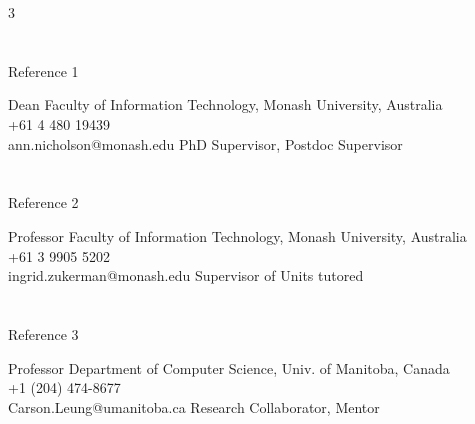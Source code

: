\begin{multicols}{3}

\section{\faUniversity}{Reference 1}
    
%
    {Dean}%
    {Faculty of Information Technology, Monash University, Australia\\ 
    \faPhone \hspace{5pt} +61 4 480 19439 \hspace{20pt}\\
    \faEnvelope \hspace{5pt} ann.nicholson@monash.edu}
    {PhD Supervisor, Postdoc Supervisor}



\columnbreak

\section{\faInstitution}{Reference 2}

%
    {Professor}%
    {Faculty of Information Technology, Monash University, Australia\\ 
    \faPhone \hspace{5pt} +61 3 9905 5202 \hspace{20pt}\\
    \faEnvelope \hspace{5pt} ingrid.zukerman@monash.edu}
    {Supervisor of Units tutored}


\columnbreak

\section{\faInstitution}{Reference 3}

%
    {Professor}%
    {Department of Computer Science, Univ. of Manitoba, Canada\\
    \faPhone \hspace{5pt}  +1 (204) 474-8677 \hspace{20pt}\\
    \faEnvelope \hspace{5pt} Carson.Leung@umanitoba.ca}
    {Research Collaborator, Mentor}

\end{multicols}